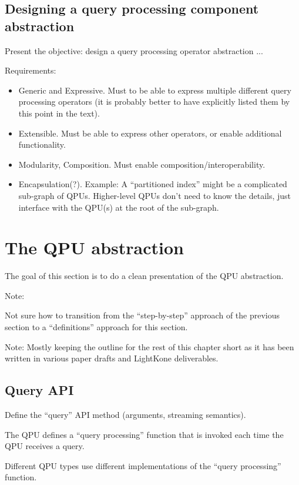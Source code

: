 \subsection{Designing a query processing component abstraction}
Present the objective: design a query processing operator abstraction ...

Requirements:
\begin{itemize}
  \item Generic and Expressive. Must to be able to express multiple different
  query processing operators (it is probably better to have explicitly listed
  them by this point in the text).
  \item Extensible. Must be able to express other operators, or enable
  additional functionality.
  \item Modularity, Composition. Must enable composition/interoperability.
  \item Encapsulation(?). Example: A ``partitioned index'' might be a
  complicated sub-graph of QPUs.
  Higher-level QPUs don't need to know the details, just interface with the
  QPU(s) at the root of the sub-graph.
\end{itemize}

\section{The QPU abstraction}
The goal of this section is to do a clean presentation of the QPU abstraction.

\begin{tcolorbox}
Note:

Not sure how to transition from the ``step-by-step'' approach of the
previous section to a ``definitions'' approach for this section.
\end{tcolorbox}

Note: Mostly keeping the outline for the rest of this chapter short as it has
been written in various paper drafts and LightKone deliverables.

\subsection{Query API}
Define the ``query'' API method (arguments, streaming semantics).

The QPU defines a ``query processing'' function that is invoked each time the
QPU receives a query.

Different QPU types use different implementations of the ``query processing''
function.


